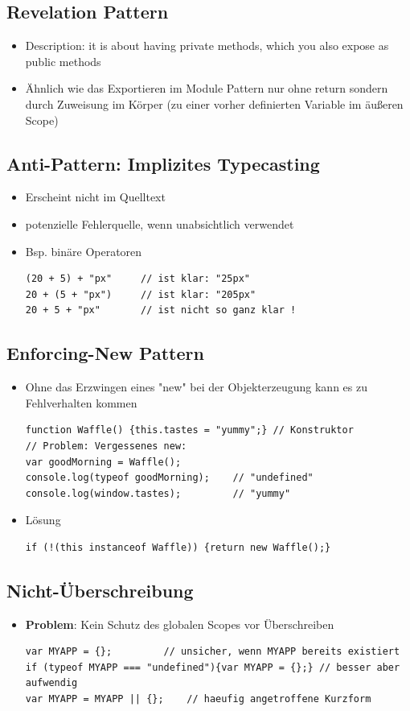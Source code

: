 \documentclass{article} %
\begin{document}
		\subsection{Revelation Pattern}
		\begin{itemize}
			\item Description: it is about having private methods, which you also expose as public methods
			\item Ähnlich wie das Exportieren im Module Pattern nur ohne return sondern durch Zuweisung im Körper (zu einer vorher definierten Variable im äußeren Scope)
		\end{itemize}
		
		\subsection{Anti-Pattern: Implizites Typecasting}
		\begin{itemize}
			\item Erscheint nicht im Quelltext
			\item potenzielle Fehlerquelle, wenn unabsichtlich verwendet 
			\item Bsp. binäre Operatoren
			 \begin{lstlisting}
(20 + 5) + "px"		// ist klar: "25px"
20 + (5 + "px") 	// ist klar: "205px"
20 + 5 + "px" 		// ist nicht so ganz klar !
			\end{lstlisting}
		\end{itemize}
		\subsection{Enforcing-New Pattern}
		\begin{itemize}
			\item Ohne das Erzwingen eines "new" bei der Objekterzeugung kann es zu Fehlverhalten kommen
			 \begin{lstlisting}
function Waffle() {this.tastes = "yummy";} // Konstruktor
// Problem: Vergessenes new:
var goodMorning = Waffle();
console.log(typeof goodMorning); 	// "undefined"
console.log(window.tastes); 		// "yummy"
			\end{lstlisting}
			\item Lösung
			\begin{lstlisting}
if (!(this instanceof Waffle)) {return new Waffle();}
			\end{lstlisting}	
		\end{itemize}
		\subsection{Nicht-Überschreibung}
		\begin{itemize}
			\item \textbf{Problem}: Kein Schutz des globalen Scopes vor Überschreiben
			\begin{lstlisting}
var MYAPP = {}; 		// unsicher, wenn MYAPP bereits existiert
if (typeof MYAPP === "undefined"){var MYAPP = {};} // besser aber aufwendig
var MYAPP = MYAPP || {}; 	// haeufig angetroffene Kurzform
			\end{lstlisting}	
		\end{itemize}
\end{document}
